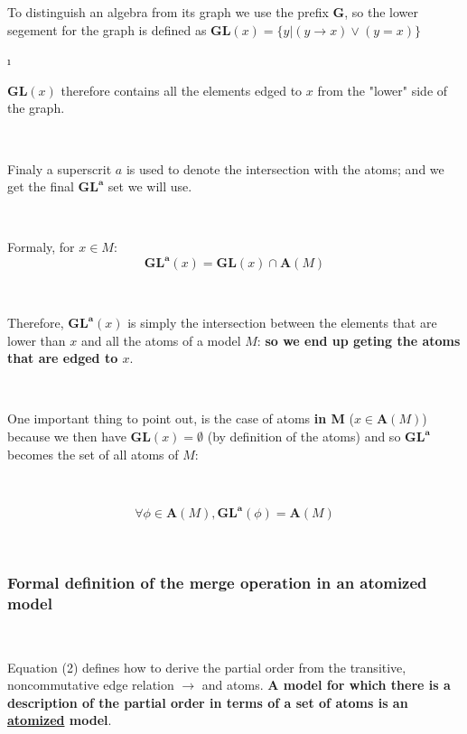 \documentclass[a4paper, 11pt]{article}
\begin{document}
To distinguish an algebra from its graph we use the prefix $\boldsymbol{G}$, so the lower segement for the graph is defined as $\boldsymbol{GL}(x) = \{ y | (y \rightarrow x) \lor (y = x)\}$

\i

$\boldsymbol{GL}(x)$ therefore contains all the elements edged to $x$ from the "lower" side of the graph.

\

Finaly a superscrit $a$ is used to denote the intersection with the atoms; and we get the final $\boldsymbol{GL}^{\boldsymbol{a}}$ set we will use. 

\

\begin{tcolorbox}
Formaly, for $x \in M$:
\begin{equation}
    \boldsymbol{GL}^{\boldsymbol{a}}(x) = \boldsymbol{GL}(x) \cap \boldsymbol{A}(M)
\end{equation}
\end{tcolorbox}

\

Therefore, $\boldsymbol{GL}^{\boldsymbol{a}}(x)$ is simply the intersection between the elements that are lower than $x$ and all the atoms of a model $M$: \textbf{so we end up geting the atoms that are edged to $x$}.

\

One important thing to point out, is the case of atoms \textbf{in M} ($x \in \boldsymbol{A}(M)$) because we then have $\boldsymbol{GL}(x) = \emptyset$ (by definition of the atoms) and so $\boldsymbol{GL}^{\boldsymbol{a}}$ becomes the set of all atoms of $M$:

\

\begin{tcolorbox}
\begin{equation}
    \forall \phi \in \boldsymbol{A}(M), \boldsymbol{GL}^{\boldsymbol{a}}(\phi) = \boldsymbol{A}(M)
\end{equation}
\end{tcolorbox}

\

\subsubsection{Formal definition of the merge operation in an atomized model}

\

Equation (2) defines how to derive the partial order from the transitive, noncommutative edge relation $\rightarrow$ and atoms. \textbf{A model for which there is a description of the partial order in terms of a set of atoms is an \underline{atomized} model}.
\end{document}
